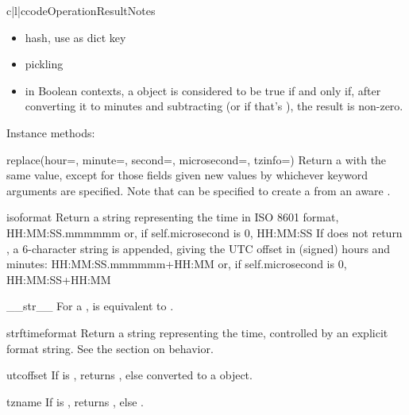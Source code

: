 \begin{tableiii}{c|l|c}{code}{Operation}{Result}{Notes}
\begin{itemize}
  \item
    hash, use as dict key

  \item
    pickling

  \item
    in Boolean contexts, a  object is considered to be
    true if and only if, after converting it to minutes and
    subtracting  (or  if that's
    ), the result is non-zero.
\end{itemize}

Instance methods:

\begin{methoddesc}{replace}(hour=, minute=, second=, microsecond=, tzinfo=)
    Return a  with the same value, except for those fields given
    new values by whichever keyword arguments are specified.  Note that
     can be specified to create a {\naive}  from an
    aware .
\end{methoddesc}

\begin{methoddesc}{isoformat}{}
    Return a string representing the time in ISO 8601 format,
        HH:MM:SS.mmmmmm
    or, if self.microsecond is 0,
        HH:MM:SS
    If  does not return , a 6-character
    string is appended, giving the UTC offset in (signed) hours and
    minutes:
        HH:MM:SS.mmmmmm+HH:MM
    or, if self.microsecond is 0,
        HH:MM:SS+HH:MM
\end{methoddesc}

\begin{methoddesc}{__str__}{}
    For a  ,  is equivalent to
    .
\end{methoddesc}

\begin{methoddesc}{strftime}{format}
    Return a string representing the time, controlled by an explicit
    format string.  See the section on  behavior.
\end{methoddesc}

\begin{methoddesc}{utcoffset}{}
    If  is , returns , else
     converted to a 
    object.
\end{methoddesc}

\begin{methoddesc}{tzname}{}
    If  is , returns , else
    .
\end{methoddesc}


\end{tableiii}
